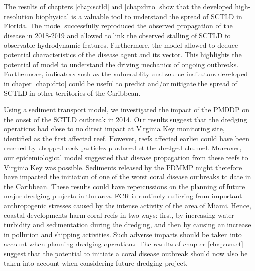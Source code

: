 The results of chapters \ref{chap:sctld} and \ref{chap:drto} show that the developed high-resolution biophysical is a valuable tool to understand the spread of SCTLD in Florida. The model successfully reproduced the observed propagation of the disease in 2018-2019 and allowed to link the observed stalling of SCTLD to observable hydrodynamic features. Furthermore, the model allowed to deduce potential characteristics of the disease agent and its vector. This highlights the potential of  model to understand the driving mechanics of ongoing outbreaks. Furthermore, indicators such as the vulnerablity and source indicators developed in chaper \ref{chap:drto} could be useful to predict and/or mitigate the spread of SCTLD in other territories of the Caribbean.

Using a sediment transport model, we investigated the impact of the PMDDP on the onset of the SCTLD outbreak in 2014. Our results suggest that the dredging operations had close to no direct impact at Virginia Key monitoring site, identified as the first affected reef. However, reefs affected earlier could have been reached by chopped rock particles produced at the dredged channel. Moreover, our epidemiological model suggested that disease propagation from these reefs to Virginia Key was possible. Sediments released by the PDMMP might therefore have impacted the initiation of one of the worst coral disease outbreaks to date in the Caribbean. These results could have repercussions on the planning of future major dredging projects in the area. FCR is routinely suffering from important anthropogenic stresses caused by the intense activity of the area of Miami. Hence, coastal developments harm coral reefs in two ways: first, by increasing water turbidity and sedimentation during the dredging, and then by causing an increase in pollution and shipping activities. Such adverse impacts should be taken into account when planning dredging operations. The results of chapter \ref{chap:onset} suggest that the potential to initiate a coral disease outbreak should now also be taken into account when considering future dredging project.

